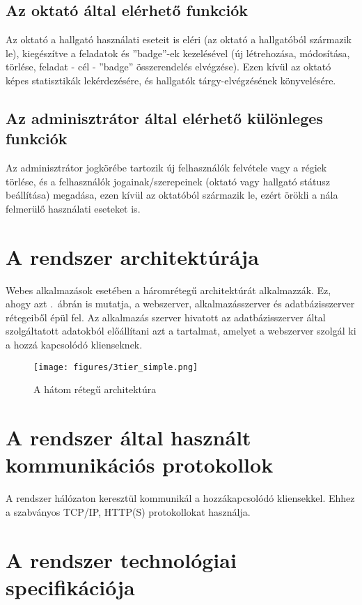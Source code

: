 \documentclass[a4paper,10pt,titlepage]{article}
\begin{document}
\subsection{Az oktató által elérhető funkciók}

Az oktató a hallgató használati eseteit is eléri (az oktató a hallgatóból származik le), kiegészítve a feladatok és ''badge''-ek kezelésével (új létrehozása, módosítása, törlése, feladat - cél - ''badge'' összerendelés elvégzése). Ezen kívül az oktató képes statisztikák lekérdezésére, és hallgatók tárgy-elvégzésének könyvelésére. 

\subsection{Az adminisztrátor által elérhető különleges funkciók}

Az adminisztrátor jogkörébe tartozik új felhasználók felvétele vagy a régiek törlése, és a felhasználók jogainak/szerepeinek (oktató vagy hallgató státusz beállítása) megadása, ezen kívül az oktatóból származik le, ezért örökli a nála felmerülő használati eseteket is.

\section{A rendszer architektúrája}

Webes alkalmazások esetében a háromrétegű architektúrát alkalmazzák. Ez, ahogy azt .~ábrán is mutatja, a webszerver, alkalmazásszerver és adatbázisszerver rétegeiből épül fel. Az alkalmazás szerver hivatott az adatbázisszerver által szolgáltatott adatokból előállítani azt a tartalmat, amelyet a webszerver szolgál ki a hozzá kapcsolódó klienseknek.

\begin{figure}[ht!]
\centering
\texttt{[image: figures/3tier\_simple.png]}
\caption{A hátom rétegű architektúra \label{fig:3tier_simple}}
\end{figure}

\section{A rendszer által használt kommunikációs protokollok}

A rendszer hálózaton keresztül kommunikál a hozzákapcsolódó kliensekkel. Ehhez a szabványos TCP/IP, HTTP(S) protokollokat használja.

\section{A rendszer technológiai specifikációja}
\end{document}
